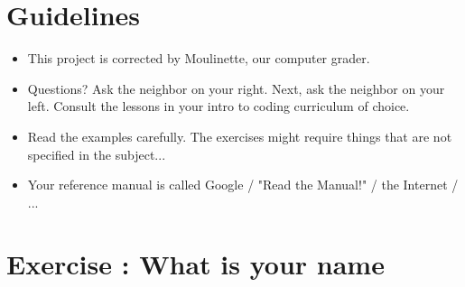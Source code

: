 \documentclass{42-en}
\begin{document}

\chapter{Guidelines}

\begin{itemize}

  \item This project is corrected by Moulinette, our computer grader.
 
  \item Questions? Ask the neighbor on your right. Next, ask the neighbor on your left. Consult the lessons in your intro to coding curriculum of choice.
  
  \item Read the examples carefully. The exercises might require things that are not specified in the subject...

  \item Your reference manual is called Google / "Read the Manual!" / the Internet / ...

\end{itemize}

\newpage


\startexercices



\chapter{Exercise \exercicenumber: What is your name}

\exnumber{\exercicenumber}

\end{document}
